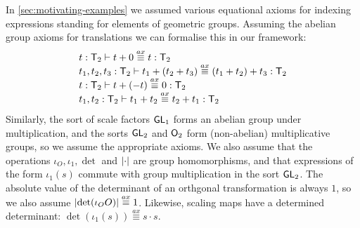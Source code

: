 \begin{example}
  \label{ex:two-dim-geo-axioms}
  In \autoref{sec:motivating-examples} we assumed 
  various equational axioms %
  for indexing expressions standing for
  elements of geometric groups. Assuming the abelian group axioms for
  translations we can formalise this in our %
  framework:
  \begin{displaymath}
    \begin{array}{l}
      t : \mathsf{T}_2 \vdash t + 0 \stackrel{ax}\equiv t : \mathsf{T}_2 \\
      t_1, t_2, t_3 : \mathsf{T}_2 \vdash t_1 + (t_2 + t_3) \stackrel{ax}\equiv (t_1 + t_2) + t_3 : \mathsf{T}_2 \\
      t : \mathsf{T}_2 \vdash t + (-t) \stackrel{ax}\equiv 0 : \mathsf{T}_2 \\
      t_1, t_2 : \mathsf{T}_2 \vdash t_1 + t_2 \stackrel{ax}\equiv t_2 + t_1 : \mathsf{T}_2 \\
    \end{array}
  \end{displaymath}
  Similarly, the sort of scale factors $\mathsf{GL}_1$ forms an abelian
  group under multiplication, and the sorts $\mathsf{GL}_2$ and
  $\mathsf{O}_2$ form (non-abelian) multiplicative groups, so we assume
  the appropriate axioms. We also assume that the operations $\iota_O,
  \iota_1, \det$ and $\lvert \cdot \rvert$ are group homomorphisms, and that
  expressions of the form $\iota_1(s)$ commute with group
  multiplication in the sort $\mathsf{GL}_2$. The absolute value of the
  determinant of an orthgonal transformation is always $1$, so we also
  assume $\lvert \det(\iota_OO) \rvert \stackrel{ax}\equiv 1$. Likewise, scaling
  maps have a determined determinant: $\det(\iota_1(s))
  \stackrel{ax}\equiv s \cdot s$.
\end{example}

